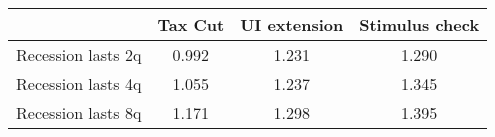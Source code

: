 \begin{tabular}{@{}lccc@{}}
\toprule
& Tax Cut    & UI extension    & Stimulus check    \\  \midrule
Recession lasts 2q &0.992  & 1.231  & 1.290     \\
Recession lasts 4q &1.055  & 1.237  & 1.345     \\
Recession lasts 8q &1.171  & 1.298  & 1.395     \\
\end{tabular}
